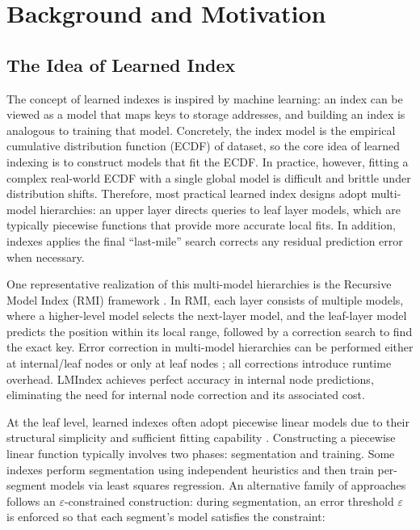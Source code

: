 \section{Background and Motivation}
\label{sec:back&moti}
\subsection{The Idea of Learned Index}
The concept of learned indexes is inspired by machine learning: an index can be viewed as a model that maps keys to storage addresses, and building an index is analogous to training that model\cite{case18}. Concretely, the index model is the empirical cumulative distribution function (ECDF) of dataset, so the core idea of learned indexing is to construct models that fit the ECDF. In practice, however, fitting a complex real-world ECDF with a single global model is difficult and brittle under distribution shifts. Therefore, most practical learned index designs adopt multi-model hierarchies: an upper layer directs queries to leaf layer models, which are typically piecewise functions that provide more accurate local fits. In addition, indexes applies the final “last-mile” search corrects any residual prediction error when necessary.

One representative realization of this multi-model hierarchies is the Recursive Model Index (RMI) framework \cite{case18}. In RMI, each layer consists of multiple models, where a higher-level model selects the next-layer model, and the leaf-layer model predicts the position within its local range, followed by a correction search to find the exact key. Error correction in multi-model hierarchies can be performed either at internal/leaf nodes \cite{pgm20, xindex20, finedex21} or only at leaf nodes \cite{case18, alex20}; all corrections introduce runtime overhead. LMIndex achieves perfect accuracy in internal node predictions, eliminating the need for internal node correction and its associated cost.

At the leaf level, learned indexes often adopt piecewise linear models due to their structural simplicity and sufficient fitting capability \cite{sosd20}. Constructing a piecewise linear function typically involves two phases: segmentation and training. Some indexes \cite{alex20, swix24, carmi22} perform segmentation using independent heuristics and then train per-segment models via least squares regression. An alternative family of approaches \cite{fiting-tree19, pgm20, bourbon20} follows an $\varepsilon$-constrained construction: during segmentation, an error threshold $\varepsilon$ is enforced so that each segment’s model satisfies the constraint:

